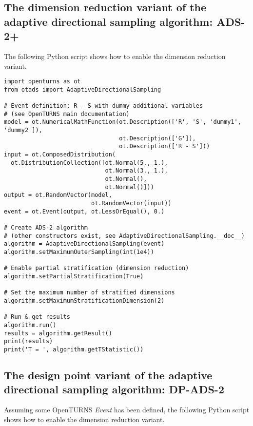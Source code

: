 \subsection{The dimension reduction variant of the adaptive directional sampling algorithm: ADS-2+}

The following Python script shows how to enable the dimension reduction variant.\par

\begin{lstlisting}
import openturns as ot
from otads import AdaptiveDirectionalSampling

# Event definition: R - S with dummy additional variables
# (see OpenTURNS main documentation)
model = ot.NumericalMathFunction(ot.Description(['R', 'S', 'dummy1', 'dummy2']),
                                 ot.Description(['G']),
                                 ot.Description(['R - S']))
input = ot.ComposedDistribution(
  ot.DistributionCollection([ot.Normal(5., 1.),
                             ot.Normal(3., 1.),
                             ot.Normal(),
                             ot.Normal()]))
output = ot.RandomVector(model,
                         ot.RandomVector(input))
event = ot.Event(output, ot.LessOrEqual(), 0.)

# Create ADS-2 algorithm
# (other constructors exist, see AdaptiveDirectionalSampling.__doc__)
algorithm = AdaptiveDirectionalSampling(event)
algorithm.setMaximumOuterSampling(int(1e4))

# Enable partial stratification (dimension reduction)
algorithm.setPartialStratification(True)

# Set the maximum number of stratified dimensions
algorithm.setMaximumStratificationDimension(2)

# Run & get results
algorithm.run()
results = algorithm.getResult()
print(results)
print('T = ', algorithm.getTStatistic())
\end{lstlisting}

\subsection{The design point variant of the adaptive directional sampling algorithm: DP-ADS-2}

Assuming some OpenTURNS \emph{Event} has been defined, the following Python script shows how to enable the dimension reduction variant.\par

